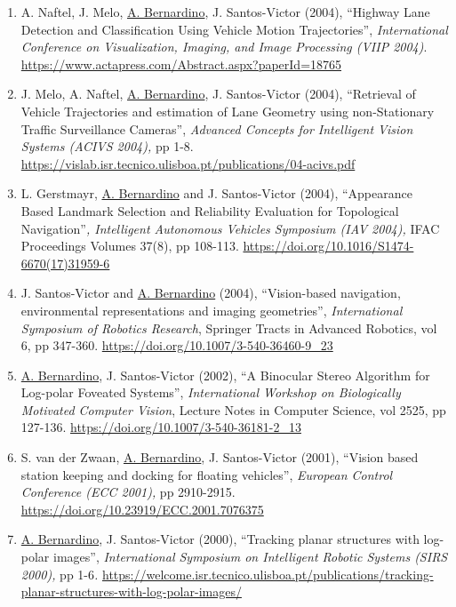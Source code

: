 \begin{enumerate}
  \emph{International Conference on Image Analysis and Recognition
  (ICIAR)}, Lecture Notes in Computer Science, Springer, vol 3212, pp
  454--462. \url{https://doi.org/10.1007/978-3-540-30126-4_56}~
\item
  A. Naftel, J. Melo, \ul{A. Bernardino}, J. Santos-Victor (2004),
  ``Highway Lane Detection and Classification Using Vehicle Motion
  Trajectories'', \emph{International Conference on Visualization,
  Imaging, and Image Processing (VIIP 2004)}.
  \url{https://www.actapress.com/Abstract.aspx?paperId=18765}
\item
  J. Melo, A. Naftel, \ul{A. Bernardino}, J. Santos-Victor (2004),
  ``Retrieval of Vehicle Trajectories and estimation of Lane Geometry
  using non-Stationary Traffic Surveillance Cameras'', \emph{Advanced
  Concepts for Intelligent Vision Systems (ACIVS 2004),} pp 1-8.
  \url{https://vislab.isr.tecnico.ulisboa.pt/publications/04-acivs.pdf}~
\item
  L. Gerstmayr, \ul{A. Bernardino} and J. Santos-Victor (2004),
  ``Appearance Based Landmark Selection and Reliability Evaluation for
  Topological Navigation''\emph{, Intelligent Autonomous Vehicles
  Symposium (IAV 2004),} IFAC Proceedings Volumes 37(8), pp 108-113.
  \url{https://doi.org/10.1016/S1474-6670(17)31959-6}~
\item
  J. Santos-Victor and \ul{A. Bernardino} (2004), ``Vision-based
  navigation, environmental representations and imaging geometries'',
  \emph{International Symposium of Robotics Research}, Springer Tracts
  in Advanced Robotics, vol 6, pp 347-360.
  \url{https://doi.org/10.1007/3-540-36460-9_23}~
\item
  \ul{A. Bernardino}, J. Santos-Victor (2002), ``A Binocular Stereo
  Algorithm for Log-polar Foveated Systems'', \emph{International
  Workshop on Biologically Motivated Computer Vision}, Lecture Notes in
  Computer Science, vol 2525, pp 127-136.
  \url{https://doi.org/10.1007/3-540-36181-2_13}~
\item
  S. van der Zwaan, \ul{A. Bernardino}, J. Santos-Victor (2001),
  ``Vision based station keeping and docking for floating vehicles'',
  \emph{European Control Conference (ECC 2001),} pp 2910-2915.
  \url{https://doi.org/10.23919/ECC.2001.7076375}~
\item
  \ul{A. Bernardino}, J. Santos-Victor (2000), ``Tracking planar
  structures with log-polar images'', \emph{International Symposium on
  Intelligent Robotic Systems (SIRS 2000),} pp 1-6\emph{.}
  \url{https://welcome.isr.tecnico.ulisboa.pt/publications/tracking-planar-structures-with-log-polar-images/}~

\end{enumerate}
